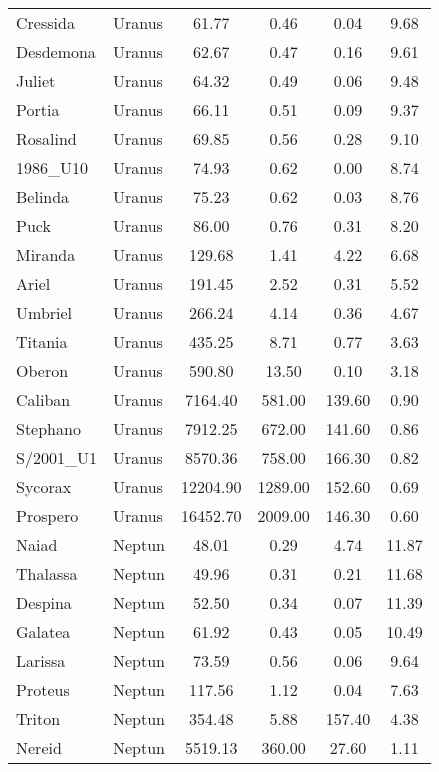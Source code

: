 \documentclass[a4paper,12pt]{scrartcl}
\begin{document}
\begin{longtable}{|l|l|S|S|S|S|}
  Cressida &  Uranus &  61.77  & 0.46  & 0.04  & 9.68  \\
  Desdemona &  Uranus &  62.67  & 0.47  & 0.16  & 9.61  \\
  Juliet &  Uranus &  64.32  & 0.49  & 0.06  & 9.48  \\
  Portia &  Uranus &  66.11  & 0.51  & 0.09  & 9.37  \\
  Rosalind &  Uranus &  69.85  & 0.56  & 0.28  & 9.10  \\
  1986\_U10 &  Uranus &  74.93  & 0.62  & 0.00  & 8.74  \\
  Belinda &  Uranus &  75.23  & 0.62  & 0.03  & 8.76  \\
  Puck &  Uranus &  86.00  & 0.76  & 0.31  & 8.20  \\
  Miranda &  Uranus &  129.68  & 1.41  & 4.22  & 6.68  \\
  Ariel &  Uranus &  191.45  & 2.52  & 0.31  & 5.52  \\
  Umbriel &  Uranus &  266.24  & 4.14  & 0.36  & 4.67  \\
  Titania &  Uranus &  435.25  & 8.71  & 0.77  & 3.63  \\
  Oberon &  Uranus &  590.80  & 13.50  & 0.10  & 3.18  \\
  Caliban &  Uranus &  7164.40  & 581.00  & 139.60  & 0.90  \\
  Stephano &  Uranus &  7912.25  & 672.00  & 141.60  & 0.86  \\
  S/2001\_U1 &  Uranus &  8570.36  & 758.00  & 166.30  & 0.82  \\
  Sycorax &  Uranus &  12204.90  & 1289.00  & 152.60  & 0.69  \\
  Prospero &  Uranus &  16452.70  & 2009.00  & 146.30  & 0.60  \\
  Naiad &  Neptun &  48.01  & 0.29  & 4.74  & 11.87  \\
  Thalassa &  Neptun &  49.96  & 0.31  & 0.21  & 11.68  \\
  Despina &  Neptun &  52.50  & 0.34  & 0.07  & 11.39  \\
  Galatea &  Neptun &  61.92  & 0.43  & 0.05  & 10.49  \\
  Larissa &  Neptun &  73.59  & 0.56  & 0.06  & 9.64  \\
  Proteus &  Neptun &  117.56  & 1.12  & 0.04  & 7.63  \\
  Triton &  Neptun &  354.48  & 5.88  & 157.40  & 4.38  \\
  Nereid &  Neptun &  5519.13  & 360.00  & 27.60  & 1.11  \\
\end{longtable}
\end{document}
